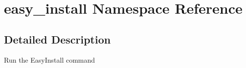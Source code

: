 \hypertarget{namespaceeasy__install}{}\section{easy\+\_\+install Namespace Reference}
\label{namespaceeasy__install}


\subsection{Detailed Description}
\begin{DoxyVerb}Run the EasyInstall command\end{DoxyVerb}
 